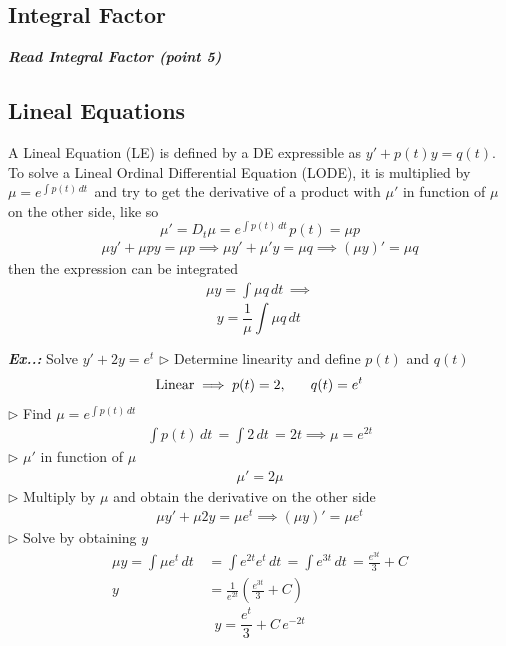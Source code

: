 \documentclass[a4paper]{article}
\begin{document}
\subsection{Integral Factor}
\textbf{\textit{Read Integral Factor (point 5)}}

\subsection{Lineal Equations}
A Lineal Equation (LE) is defined by a DE expressible as $y'+p(t)y=q(t)$. To solve a Lineal Ordinal Differential Equation (LODE), it is multiplied by $\mu=e^{ \int p(t) \, dt\, }$  and try to get the derivative of a product with $\mu'$ in function of $\mu$ on the other side, like so
$$
\mu'=D_{t}\mu=e^{ \int p(t) \, dt\,  }p(t)=\mu p
$$
\begin{align}
\mu y'+\mu py=\mu p\implies \mu y'+\mu'y=\mu q\implies(\mu y)'=\mu q
\end{align}
then the expression can be integrated
\begin{align}
\mu y=\int \mu q \, dt\, \implies
\end{align}
$$
\boxed{y=\frac{1}{\mu}\int \mu q \, dt\, }
$$
\vspace{1ex}\vspace{1ex}

\vspace{2ex}\textbf{\textit{Ex.\thesection.\theex: }}Solve $y'+2y=e^{t}$
$\triangleright$ Determine linearity and define $p(t)$ and $q(t)$
$$
\text{Linear}\implies p(t)=2,\hspace{4ex}q(t)=e^{ t }
$$
$\triangleright$ Find $\mu=e^{ \int p(t) \, dt\, }$
\begin{align}
\int p(t) \, dt\, =\int 2 \, dt\, =2t\implies \mu=e^{ 2t }
\end{align}
$\triangleright$ $\mu'$ in function of $\mu$
\begin{align}
\mu'=2\mu
\end{align}
$\triangleright$ Multiply by $\mu$ and obtain the derivative on the other side
\begin{align}
\mu y'+\mu 2y=\mu e^{ t }\implies(\mu y)'=\mu e^{ t }
\end{align}
$\triangleright$ Solve by obtaining $y$
\begin{align}
\mu y=\int \mu e^{ t } \, dt\, &=\int e^{ 2t }e^{ t } \, dt\, =\int e^{ 3t } \, dt\, =\frac{e^{ 3t }}{3}+C \\
y&=\frac{1}{e^{ 2t }}\left( \frac{e^{ 3t }}{3}+C \right)
\end{align}
$$
\boxed{y=\frac{e^{ t }}{3}+C\,e^{ -2t }}
$$
\end{document}
